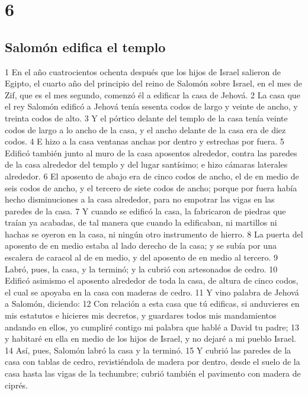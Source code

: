 \chapter{6}

\section*{Salomón edifica el templo}

1 En el año cuatrocientos ochenta después que los hijos de Israel salieron de Egipto, el cuarto año del principio del reino de Salomón sobre Israel, en el mes de Zif, que es el mes segundo, comenzó él a edificar la casa de Jehová.
2 La casa que el rey Salomón edificó a Jehová tenía sesenta codos   de largo y veinte de ancho, y treinta codos de alto.
3 Y el pórtico delante del templo de la casa tenía veinte codos   de largo a lo ancho de la casa, y el ancho delante de la casa era de diez codos.
4 E hizo a la casa ventanas anchas por dentro y estrechas por fuera.
5 Edificó también junto al muro de la casa aposentos alrededor, contra las paredes de la casa alrededor del templo y del lugar santísimo; e hizo cámaras laterales alrededor.
6 El aposento de abajo era de cinco codos   de ancho, el de en medio de seis codos de ancho, y el tercero de siete codos de ancho; porque por fuera había hecho disminuciones a la casa alrededor, para no empotrar las vigas en las paredes de la casa.
7 Y cuando se edificó la casa, la fabricaron de piedras que traían ya acabadas, de tal manera que cuando la edificaban, ni martillos ni hachas se oyeron en la casa, ni ningún otro instrumento de hierro.
8 La puerta del aposento de en medio estaba al lado derecho de la casa; y se subía por una escalera de caracol al de en medio, y del aposento de en medio al tercero.
9 Labró, pues, la casa, y la terminó; y la cubrió con artesonados de cedro.
10 Edificó asimismo el aposento alrededor de toda la casa, de altura de cinco codos,  el cual se apoyaba en la casa con maderas de cedro.
11 Y vino palabra de Jehová a Salomón, diciendo:
12 Con relación a esta casa que tú edificas, si anduvieres en mis estatutos e hicieres mis decretos, y guardares todos mis mandamientos andando en ellos, yo cumpliré contigo mi palabra que hablé a David tu padre;
13 y habitaré en ella en medio de los hijos de Israel, y no dejaré a mi pueblo Israel.
14 Así, pues, Salomón labró la casa y la terminó.
15 Y cubrió las paredes de la casa con tablas de cedro, revistiéndola de madera por dentro, desde el suelo de la casa hasta las vigas de la techumbre; cubrió también el pavimento con madera de ciprés.

